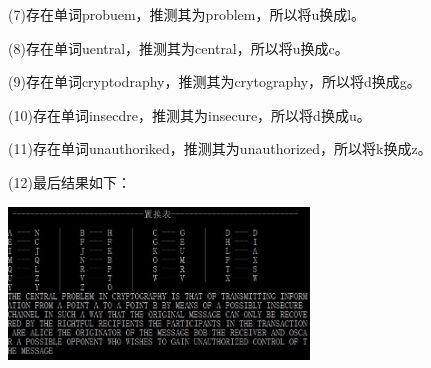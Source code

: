 \documentclass[UTF8,a4paper]{article}
\begin{document}
	(7)存在单词probuem，推测其为problem，所以将u换成l。\par
	(8)存在单词uentral，推测其为central，所以将u换成c。\par
	(9)存在单词cryptodraphy，推测其为crytography，所以将d换成g。\par
	(10)存在单词insecdre，推测其为insecure，所以将d换成u。\par
	(11)存在单词unauthoriked，推测其为unauthorized，所以将k换成z。\par
	(12)最后结果如下：\par
						\begin{center}
		\includegraphics[width=0.6\textwidth]{pic.JPG}
	\end{center}
\end{document}
